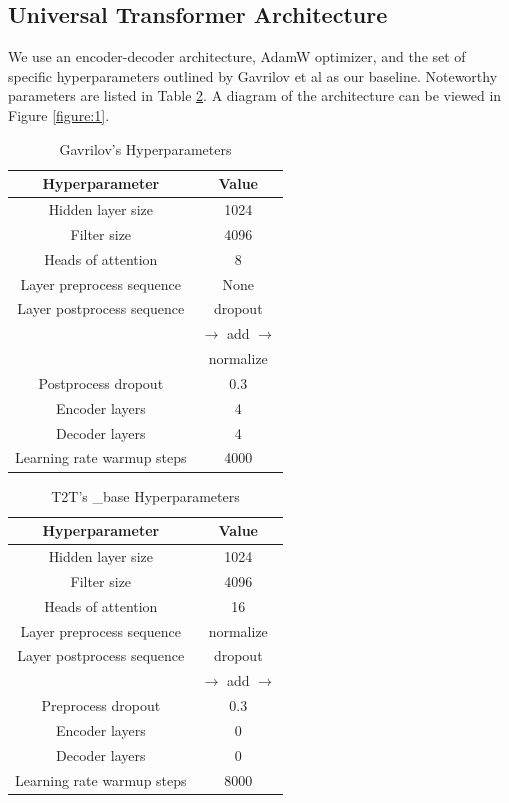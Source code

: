 \documentclass[11pt]{article}
\begin{document}
\subsection{Universal Transformer Architecture}
We use an encoder-decoder architecture, AdamW optimizer, and the set of specific hyperparameters outlined by Gavrilov et al \cite{DBLP:journals/corr/abs-1901-07786} as our baseline. Noteworthy parameters are listed in Table \ref{table:1}. A diagram of the architecture can be viewed in Figure \ref{figure:1}.

\begin{table}[h!]
\centering
\begin{tabular}{|c | c|} 
 \hline
 Hyperparameter & Value \\ [0.5ex] 
 \hline
 Hidden layer size & 1024 \\ 
 Filter size & 4096 \\
 Heads of attention & 8 \\
 Layer preprocess sequence & None \\
 Layer postprocess sequence & dropout \\
 & $\rightarrow$ add $\rightarrow$ \\
 & normalize \\
 Postprocess dropout & 0.3 \\
 Encoder layers & 4 \\
 Decoder layers & 4 \\
 Learning rate warmup steps & 4000 \\ [1ex]
 \hline
\end{tabular}
\caption{Gavrilov's Hyperparameters}
\label{table:1}
\end{table}

\begin{table}[h!]
\centering
\begin{tabular}{|c | c|} 
 \hline
 Hyperparameter & Value \\ [0.5ex] 
 \hline
 Hidden layer size & 1024 \\ 
 Filter size & 4096 \\
 Heads of attention & 16 \\
 Layer preprocess sequence & normalize \\
 Layer postprocess sequence & dropout \\
 & $\rightarrow$ add $\rightarrow$ \\
 Preprocess dropout & 0.3 \\
 Encoder layers & 0 \\
 Decoder layers & 0 \\
 Learning rate warmup steps & 8000 \\ [1ex]
 \hline
\end{tabular}
\caption{T2T's _base Hyperparameters}
\label{table:1}
\end{table}
\end{document}
